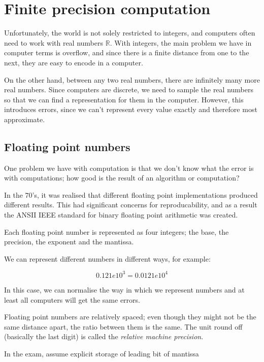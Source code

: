 
\section{Finite precision computation}

Unfortunately, the world is not solely restricted to integers, and computers
often need to work with real numbers $\mathbb{R}$. With integers, the main
problem we have in computer terms is overflow, and since there is a finite
distance from one to the next, they are easy to encode in a computer.

On the other hand, between any two real numbers, there are infinitely many more
real numbers. Since computers are discrete, we need to sample the real numbers
so that we can find a representation for them in the computer. However, this
introduces errors, since we can't represent every value exactly and therefore
most approximate.

\subsection{Floating point numbers}

One problem we have with computation is that we don't know what the error is with computations; how good is the result of an algorithm or computation?

In the $70$'s, it was realised that different floating point implementations produced different results. This had significant concerns for reproducability, and as a result the ANSII IEEE standard for binary floating point arithmetic was created.


Each floating point number is represented as four integers; the base, the precision, the exponent and the mantissa.


We can represent different numbers in different ways, for example:

\[
  0.121e10^3 = 0.0121e10^4
\]

In this case, we can normalise the way in which we represent numbers and at
least all computers will get the same errors.



Floating point numbers are relatively spaced; even though they might not be the
same distance apart, the ratio between them is the same. The unit round off
(basically the last digit) is called the \textit{relative machine precision}.


In the exam, assume explicit storage of leading bit of mantissa

